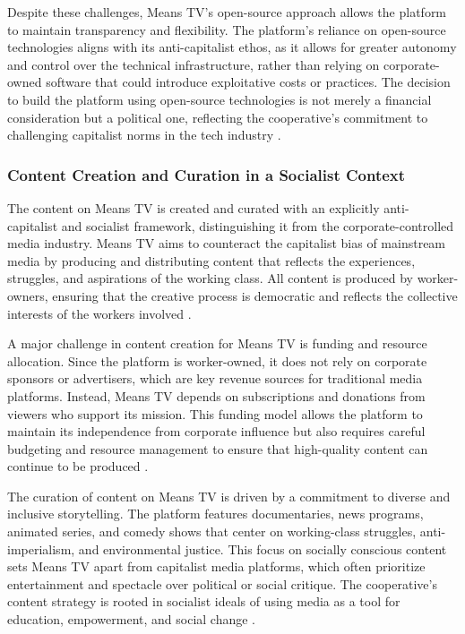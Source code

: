 \begin{refsection}
Despite these challenges, Means TV’s open-source approach allows the platform to maintain transparency and flexibility. The platform’s reliance on open-source technologies aligns with its anti-capitalist ethos, as it allows for greater autonomy and control over the technical infrastructure, rather than relying on corporate-owned software that could introduce exploitative costs or practices. The decision to build the platform using open-source technologies is not merely a financial consideration but a political one, reflecting the cooperative’s commitment to challenging capitalist norms in the tech industry \cite[pp.~77-90]{scholz2017}.

\subsubsection{Content Creation and Curation in a Socialist Context}

The content on Means TV is created and curated with an explicitly anti-capitalist and socialist framework, distinguishing it from the corporate-controlled media industry. Means TV aims to counteract the capitalist bias of mainstream media by producing and distributing content that reflects the experiences, struggles, and aspirations of the working class. All content is produced by worker-owners, ensuring that the creative process is democratic and reflects the collective interests of the workers involved \cite[pp.~89-105]{smith2009}.

A major challenge in content creation for Means TV is funding and resource allocation. Since the platform is worker-owned, it does not rely on corporate sponsors or advertisers, which are key revenue sources for traditional media platforms. Instead, Means TV depends on subscriptions and donations from viewers who support its mission. This funding model allows the platform to maintain its independence from corporate influence but also requires careful budgeting and resource management to ensure that high-quality content can continue to be produced \cite[pp.~120-136]{mason2015}.

The curation of content on Means TV is driven by a commitment to diverse and inclusive storytelling. The platform features documentaries, news programs, animated series, and comedy shows that center on working-class struggles, anti-imperialism, and environmental justice. This focus on socially conscious content sets Means TV apart from capitalist media platforms, which often prioritize entertainment and spectacle over political or social critique. The cooperative’s content strategy is rooted in socialist ideals of using media as a tool for education, empowerment, and social change \cite[pp.~45-60]{scholz2017}.


\end{refsection}
